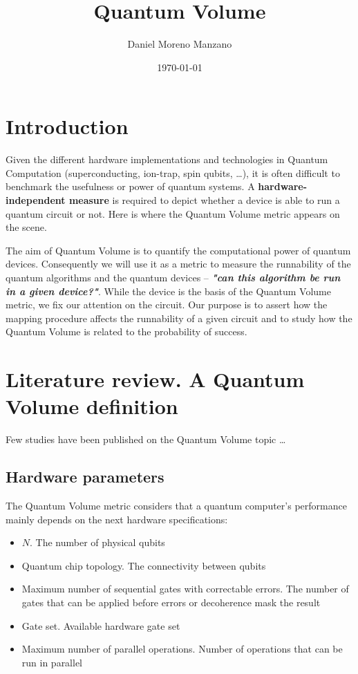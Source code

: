 \documentclass[11pt]{article}
\author{Daniel Moreno Manzano}
\date{\today}
\title{Quantum Volume}
\begin{document}
\maketitle


\section{Introduction}
\label{sec:orge496b19}

Given the different hardware implementations and technologies in Quantum Computation (superconducting, ion-trap, spin qubits, \ldots{}), it is often difficult to benchmark the usefulness or power of quantum systems. 
A \textbf{hardware-independent measure} is required to depict whether a device is able to run a quantum circuit or not.
Here is where the Quantum Volume metric appears on the scene.

The aim of Quantum Volume is to quantify the computational power of quantum devices. 
Consequently we will use it as a metric to measure the runnability of the quantum algorithms and the quantum devices -- \emph{\textbf{"can this algorithm be run in a given device?"}}.
While the device is the basis of the Quantum Volume metric, we fix our attention on the circuit.
Our purpose is to assert how the mapping procedure affects the runnability of a given circuit and to study how the Quantum Volume is related to the probability of success.

\section{Literature review. A Quantum Volume definition}
\label{sec:org43771bc}

Few studies have been published on the Quantum Volume topic \cite{Bishop_2017,Moll_2018}\ldots{}

\subsection{Hardware parameters}
\label{sec:orga0c71cb}

The Quantum Volume metric considers that a quantum computer's performance mainly depends on the next hardware specifications:

\begin{itemize}
\item \(N\). The number of physical qubits
\item Quantum chip topology. The connectivity between qubits
\item Maximum number of sequential gates with correctable errors. The number of gates that can be applied before errors or decoherence mask the result
\item Gate set. Available hardware gate set
\item Maximum number of parallel operations. Number of operations that can be run in parallel
\end{itemize}
\end{document}
